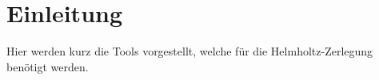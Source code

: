 %
%
%
%
\section{Einleitung
\label{helmholtz:section:teil1}}

Hier werden kurz die Tools vorgestellt, welche für die Helmholtz-Zerlegung benötigt werden.



